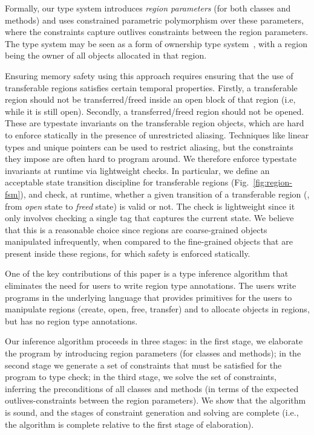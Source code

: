 \documentclass[a4paper,UKenglish]{lipics-v2018}
\begin{document}
Formally, our type system introduces \emph{region parameters} (for both
classes and methods) and uses constrained parametric polymorphism
over these parameters, where the constraints capture outlives constraints
between the region parameters.
The type system may be seen as a form of ownership type system~\cite{OwnershipSurvey},
with a region being the owner of all objects allocated in that region.

Ensuring memory safety using this approach requires ensuring
that the use of transferable regions satisfies certain temporal properties.
Firstly, a transferable region should not be transferred/freed
inside an open block of that region (i.e, while it is still open).
Secondly, a transferred/freed region should not be opened. These are
typestate invariants on the transferable region objects, which are
hard to enforce statically in the presence of unrestricted
aliasing. Techniques like linear types and unique pointers can be used
to restrict aliasing, but the constraints they impose are often hard
to program around. We therefore enforce typestate invariants at
runtime via lightweight checks. In particular, we define an acceptable
state transition discipline for transferable regions
(Fig.~\ref{fig:region-fsm}), and check, at runtime, whether a given
transition of a transferable region (\eg, from \emph{open} state to
\emph{freed} state) is valid or not. The check is lightweight since it
only involves checking a single tag that captures the current state.
We believe that this is a reasonable choice since regions are
coarse-grained objects manipulated infrequently, when compared to the
fine-grained objects that are present inside these regions, for which
safety is enforced statically. 

One of the key contributions of this paper is a type inference
algorithm that eliminates the need for users to write region type
annotations.  The users write programs in the underlying language that
provides primitives for the users to manipulate regions (create, open,
free, transfer) and to allocate objects in regions, but has no region
type annotations.

Our inference algorithm proceeds in three stages: in the first stage,
we elaborate the program by introducing region parameters (for classes
and methods); in the second stage we generate a set of constraints
that must be satisfied for the program to type check; in the third
stage, we solve the set of constraints, inferring the preconditions of
all classes and methods (in terms of the expected outlives-constraints
between the region parameters).  We show that the algorithm is sound,
and the stages of constraint generation and solving are complete
(i.e., the algorithm is complete relative to the first stage of
elaboration).
\end{document}
